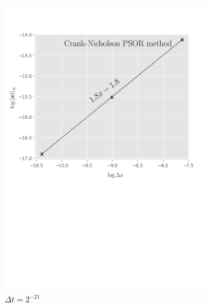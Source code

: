 \begin{figure}[tbp]
  \centering
  \begin{subfigure}{0.4\textwidth}
    \centering
    \includegraphics[width=\textwidth]{chapters/chapter5/ConvergenceSpaceCrankNicholsonLCP.pdf}
    \caption{$\Delta{x}=2^{-7},\dots,2^{-10}$}
    \caption*{$\Delta{t}=2^{-21}$}
    \label{fig:lcp:numericalresults:convergence_space_cranknicholson}
  \end{subfigure}
  \hspace{0.5cm}
  \begin{subfigure}{0.4\textwidth}
    \centering

\end{subfigure}
\end{figure}
